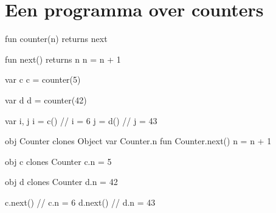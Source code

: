 \section{Een programma over counters}

\begin{minipage}{0.5\textwidth}
\begin{program}
fun counter(n) returns next

    fun next() returns n
        n = n + 1

var c
c = counter(5)

var d
d = counter(42)

var i, j
i = c() // i = 6
j = d() // j = 43
\end{program}
\end{minipage}
\begin{minipage}{0.5\textwidth}
\begin{program}
obj Counter clones Object
var Counter.n
fun Counter.next()
    n = n + 1

obj c clones Counter
c.n = 5

obj d clones Counter
d.n = 42


c.next() // c.n = 6
d.next() // d.n = 43
\end{program}
\end{minipage}

